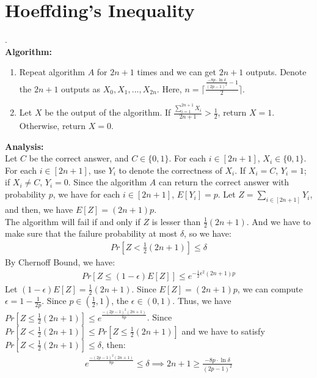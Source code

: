 \section{Hoeffding's Inequality}
.  \\
\textbf{Algorithm:}\\
\begin{enumerate}
    \item  Repeat algorithm $A$ for $2n+1$ times and we can get $2n+1$ outputs.
    Denote the $2n+1$ outputs as $X_0,X_1,...,X_{2n}$. Here, $n=\lceil \frac{\frac{-8p\cdot \ln \delta }{(2p-1)^2} -1}{2}\rceil $.
    \item Let $X$ be the output of the algorithm. 
    If $\frac{\sum_{i=1}^{2n+1}X_i}{2n+1}>\frac{1}{2}$, return $X=1$. Otherwise, return $X=0$.
\end{enumerate}
\textbf{Analysis:}\\
Let $C$ be the correct answer, and $C\in\{0,1\}$.
For each $i\in [2n+1]$, $X_i\in \{0, 1\}$. 
For each $i\in [2n+1]$, use $Y_i$ to denote the correctness of $X_i$.
If $X_i=C$, $Y_i=1$; if $X_i\neq C$, $Y_i=0$. 
Since the algorithm $A$ can return the correct answer with probability $p$, 
we have for each $i \in [2n+1]$, $E[Y_i]=p$.
Let $Z=\sum_{i\in[2n+1]}Y_i$, and then, we have $E[Z]=(2n+1)p$.\\
The algorithm will fail if and only if $Z$ is lesser than $\frac{1}{2}(2n+1)$. 
And we have to make sure that the failure probability at most $\delta$, so we have:
\begin{align}
    \nonumber  Pr[Z<\frac{1}{2}(2n+1)]\le \delta
\end{align}
By Chernoff Bound, we have:
\begin{align}
    \nonumber Pr[Z \le (1-\epsilon) E[Z]]\le e^{-\frac{1}{2}\epsilon^2(2n+1)p}
\end{align}
Let $(1-\epsilon) E[Z]= \frac{1}{2}(2n+1)$. Since $E[Z]=(2n+1)p$, we can compute $\epsilon=1-\frac{1}{2p}$.
Since $p\in (\frac{1}{2},1)$, the $\epsilon \in (0,1) $.
Thus, we have $Pr[Z \le \frac{1}{2}(2n+1)]\le e^{\frac{-(2p-1)^2(2n+1)}{8p}}$.
Since $Pr[Z < \frac{1}{2}(2n+1)]\le Pr[Z \le \frac{1}{2}(2n+1)]$ and we have to satisfy $Pr[Z<\frac{1}{2}(2n+1)]\le \delta$, then:
\begin{align}
    \nonumber e^{\frac{-(2p-1)^2(2n+1)}{8p}} \le \delta \implies 2n+1 \ge \frac{-8p\cdot \ln \delta }{(2p-1)^2}
\end{align}
